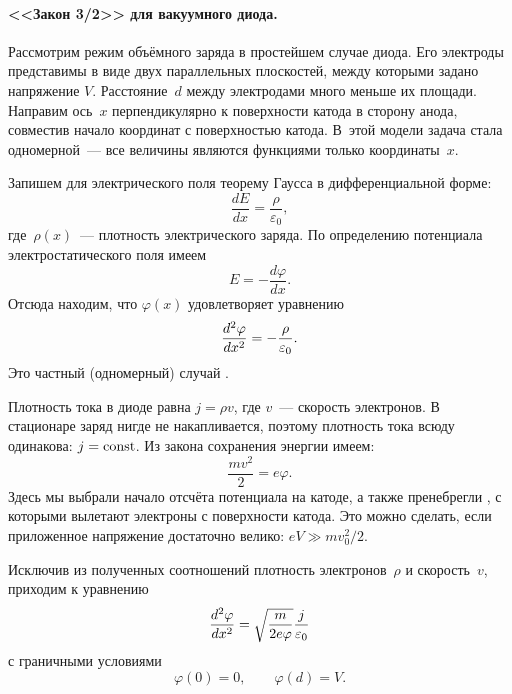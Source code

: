 \paragraph{<<Закон 3/2>> для вакуумного диода.}
Рассмотрим режим объёмного заряда в простейшем случае  диода.
Его электроды представимы в виде двух параллельных плоскостей,
между которыми задано напряжение $V$. Расстояние~$d$ между электродами много
меньше их площади. Направим ось~$x$ перпендикулярно к поверхности катода
в сторону анода, совместив начало координат с поверхностью
катода. В~этой модели задача стала одномерной~--- все величины являются
функциями только координаты~$x$.

Запишем для электрического поля теорему Гаусса в дифференциальной форме:
\[
\frac{dE}{dx} = \frac{\rho}{\varepsilon_0},
\]
где~$\rho(x)$~--- плотность электрического заряда. По определению потенциала
электростатического поля имеем
\[
E = -\frac{d\varphi}{dx}.
\]
Отсюда находим, что $\varphi(x)$ удовлетворяет уравнению
\begin{equation}
	\eqmark{3.14}
	\frac{d^2\varphi}{dx^2}=-\frac{\rho}{\varepsilon_0}.
\end{equation}
Это частный (одномерный) случай .

Плотность тока в диоде равна $j=\rho v$, где $v$~--- скорость электронов.
В стационаре заряд нигде не накапливается, поэтому плотность тока всюду одинакова: $j=\mathrm{const}$.
Из закона сохранения энергии имеем:
\begin{equation*}
	\frac{mv^2}{2}=e\varphi.
\end{equation*}
Здесь мы выбрали начало отсчёта потенциала на катоде, а также
пренебрегли ,
с которыми вылетают электроны с поверхности катода. Это можно сделать, если
приложенное напряжение достаточно велико: $eV\gg mv_0^2/2$.

Исключив из полученных соотношений плотность электронов~$\rho$ и скорость~$v$,
приходим к уравнению
\begin{equation}
	\eqmark{3.15}
    \frac{d^2\varphi}{dx^2}=\sqrt{\frac{m}{2e\varphi}} \frac{j}{\varepsilon_0}
\end{equation}
с граничными условиями
\begin{equation*}
 \varphi(0)=0,\qquad \varphi(d)=V.
\end{equation*}

